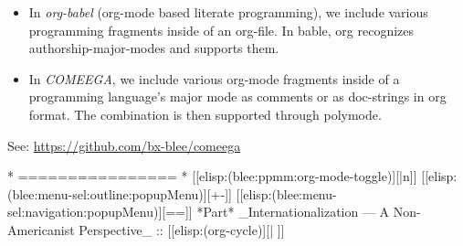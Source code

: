\begin{whenOrg}
\begin{verblatex}
\begin{frame}[fragile,plain,label=comeega]
\begin{itemize}
      \item In \colorbox{blue!60}{\color{white}\textit{org-babel}} (org-mode based literate programming), we include various programming
   fragments inside of an org-file. In bable, org recognizes authorship-major-modes and
   supports them.

      \item In \colorbox{blue!30}{\textit{COMEEGA}}, we include various org-mode fragments
            inside of a programming language’s major mode as comments or as doc-strings in
            org format. The combination is then supported through polymode.

    \end{itemize}

    See: \url{https://github.com/bx-blee/comeega}
    


\end{frame}
\end{verblatex}


\begin{whenOrg}
*      ================
*  [[elisp:(blee:ppmm:org-mode-toggle)][|n]] [[elisp:(blee:menu-sel:outline:popupMenu)][+-]] [[elisp:(blee:menu-sel:navigation:popupMenu)][==]]  *Part*   _Internationalization --- A Non-Americanist Perspective_ ::  [[elisp:(org-cycle)][| ]]
\end{whenOrg}


\end{whenOrg}
